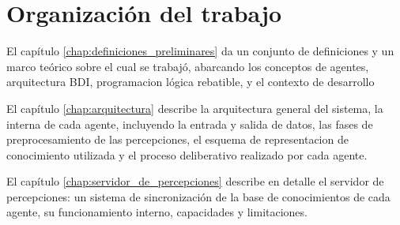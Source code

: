 \section{Organización del trabajo}
\label{sec:organizacion_del_trabajo}
 
 El capítulo \ref{chap:definiciones_preliminares} da un conjunto de
 definiciones y un marco teórico sobre el cual se trabajó, abarcando
 los conceptos de agentes, arquitectura BDI, programacion lógica
 rebatible, y el contexto de desarrollo
 
 El capítulo \ref{chap:arquitectura} describe la arquitectura general 
 del sistema,  la interna de cada agente, incluyendo la entrada y 
 salida de datos, las fases de preprocesamiento de las percepciones,
 el esquema de representacion de conocimiento utilizada y el proceso 
 deliberativo realizado por cada agente.
 
 El capítulo \ref{chap:servidor_de_percepciones} describe en detalle el
 servidor de percepciones: un sistema de sincronización de la base de 
 conocimientos de cada agente, su funcionamiento interno, capacidades 
 y limitaciones.
 
